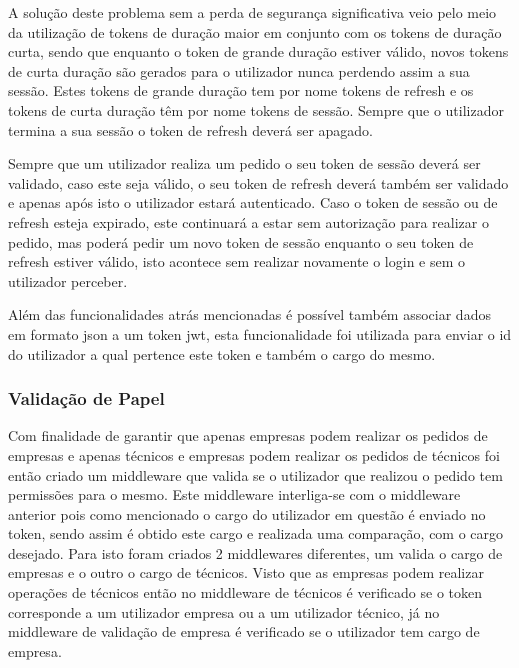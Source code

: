 A solução deste problema sem a perda de segurança significativa veio pelo meio da utilização de tokens de duração maior em conjunto com os tokens de duração curta, sendo que enquanto o token de grande duração estiver válido, novos tokens de curta duração são gerados para o utilizador nunca perdendo assim a sua sessão. Estes tokens de grande duração tem por nome tokens de refresh e os tokens de curta duração têm por nome tokens de sessão. Sempre que o utilizador termina a sua sessão o token de refresh deverá ser apagado.

Sempre que um utilizador realiza um pedido o seu token de sessão deverá ser validado, caso este seja válido, o seu token de refresh deverá também ser validado e apenas após isto o utilizador estará autenticado. Caso o token de sessão ou de refresh esteja expirado, este continuará a estar sem autorização para realizar o pedido, mas poderá pedir um novo token de sessão enquanto o seu token de refresh estiver válido, isto acontece sem realizar novamente o login e sem o utilizador perceber.

 Além das funcionalidades atrás mencionadas é possível também associar dados em formato json a um token jwt, esta funcionalidade foi utilizada para enviar o id do utilizador a qual pertence este token e também o cargo do mesmo.

\subsubsection{Validação de Papel}

Com finalidade de garantir que apenas empresas podem realizar os pedidos de empresas e apenas técnicos e empresas podem realizar os pedidos de técnicos foi então criado um middleware que valida se o utilizador que realizou o pedido tem permissões para o mesmo. Este middleware interliga-se com o middleware anterior pois como mencionado o cargo do utilizador em questão é enviado no token, sendo assim é obtido este cargo e realizada uma comparação, com o cargo desejado. Para isto foram criados 2 middlewares diferentes, um valida o cargo de empresas e o outro o cargo de técnicos. Visto que as empresas podem realizar operações de técnicos então no middleware de técnicos é verificado se o token corresponde a um utilizador empresa ou a um utilizador técnico, já no middleware de validação de empresa é verificado se o utilizador tem cargo de empresa.


